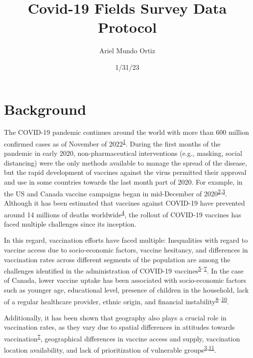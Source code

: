 \documentclass[
  letterpaper,
  DIV=11,
  numbers=noendperiod]{scrartcl}
\title{Covid-19 Fields Survey Data Protocol}
\author{Ariel Mundo Ortiz}
\date{1/31/23}
\begin{document}
\maketitle
\ifdefined\Shaded\renewenvironment{Shaded}{\begin{tcolorbox}[interior hidden, borderline west={3pt}{0pt}{shadecolor}, sharp corners, enhanced, breakable, frame hidden, boxrule=0pt]}{\end{tcolorbox}}\fi

\hypertarget{background}{%
\section{Background}\label{background}}

The COVID-19 pandemic continues around the world with more than 600
million confirmed cases as of November of
2022\textsuperscript{\protect\hyperlink{ref-WHO-Covid}{1}}. During the
first months of the pandemic in early 2020, non-pharmaceutical
interventions (e.g., masking, social distancing) were the only methods
available to manage the spread of the disease, but the rapid development
of vaccines against the virus permitted their approval and use in some
countries towards the last month part of 2020. For example, in the US
and Canada vaccine campaigns began in mid-December of
2020\textsuperscript{\protect\hyperlink{ref-tanne2020}{2},\protect\hyperlink{ref-bogoch2022}{3}}.
Although it has been estimated that vaccines against COVID-19 have
prevented around 14 millions of deaths
worldwide\textsuperscript{\protect\hyperlink{ref-watson2022}{4}}, the
rollout of COVID-19 vaccines has faced multiple challenges since its
inception.

In this regard, vaccination efforts have faced multiple: Inequalities
with regard to vaccine access due to socio-economic factors, vaccine
hesitancy, and differences in vaccination rates across different
segments of the population are among the challenges identified in the
administration of COVID-19
vaccines\textsuperscript{\protect\hyperlink{ref-gerretsen2021}{5}--\protect\hyperlink{ref-malik2020}{7}}.
In the case of Canada, lower vaccine uptake has been associated with
socio-economic factors such as younger age, educational level, presence
of children in the household, lack of a regular healthcare provider,
ethnic origin, and financial
instability\textsuperscript{\protect\hyperlink{ref-guay2022}{8}--\protect\hyperlink{ref-carter2022}{10}}.

Additionally, it has been shown that geography also plays a crucial role
in vaccination rates, as they vary due to spatial differences in
attitudes towards
vaccination\textsuperscript{\protect\hyperlink{ref-malik2020}{7}},
geographical differences in vaccine access and supply, vaccination
location availability, and lack of prioritization of vulnerable
groups\textsuperscript{\protect\hyperlink{ref-bogoch2022}{3},\protect\hyperlink{ref-nguyen2021}{11}}.
\end{document}

